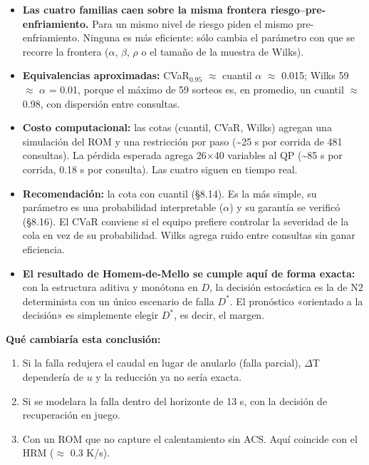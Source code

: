 \documentclass[11pt,a4paper]{article}
\begin{document}
\begin{itemize}
\item \textbf{Las cuatro familias caen sobre la misma frontera riesgo–pre-enfriamiento.} Para un mismo nivel de riesgo piden el mismo pre-enfriamiento. Ninguna es más eficiente: sólo cambia el parámetro con que se recorre la frontera ($\alpha$, $\beta$, $\rho$ o el tamaño de la muestra de Wilks).
\item \textbf{Equivalencias aproximadas:} CVaR$_{0.95}$ $\approx$ cuantil $\alpha$ $\approx$ 0.015; Wilks 59 $\approx$ $\alpha$ = 0.01, porque el máximo de 59 sorteos es, en promedio, un cuantil $\approx$ 0.98, con dispersión entre consultas.
\item \textbf{Costo computacional:} las cotas (cuantil, CVaR, Wilks) agregan una simulación del ROM y una restricción por paso (\textasciitilde{}25 s por corrida de 481 consultas). La pérdida esperada agrega 26$\times$40 variables al QP (\textasciitilde{}85 s por corrida, 0.18 s por consulta). Las cuatro siguen en tiempo real.
\item \textbf{Recomendación:} la cota con cuantil (\S{}8.14). Es la más simple, su parámetro es una probabilidad interpretable ($\alpha$) y su garantía se verificó (\S{}8.16). El CVaR conviene si el equipo prefiere controlar la severidad de la cola en vez de su probabilidad. Wilks agrega ruido entre consultas sin ganar eficiencia.
\item \textbf{El resultado de Homem-de-Mello se cumple aquí de forma exacta:} con la estructura aditiva y monótona en $D$, la decisión estocástica es la de N2 determinista con un único escenario de falla $D^*$. El pronóstico «orientado a la decisión» es simplemente elegir $D^*$, es decir, el margen.
\end{itemize}

\textbf{Qué cambiaría esta conclusión:}

\begin{enumerate}
\item Si la falla redujera el caudal en lugar de anularlo (falla parcial), $\Delta$T dependería de $u$ y la reducción ya no sería exacta.
\item Si se modelara la falla dentro del horizonte de 13 s, con la decisión de recuperación en juego.
\item Con un ROM que no capture el calentamiento sin ACS. Aquí coincide con el HRM ($\approx$ 0.3 K/s).
\end{enumerate}
\end{document}
